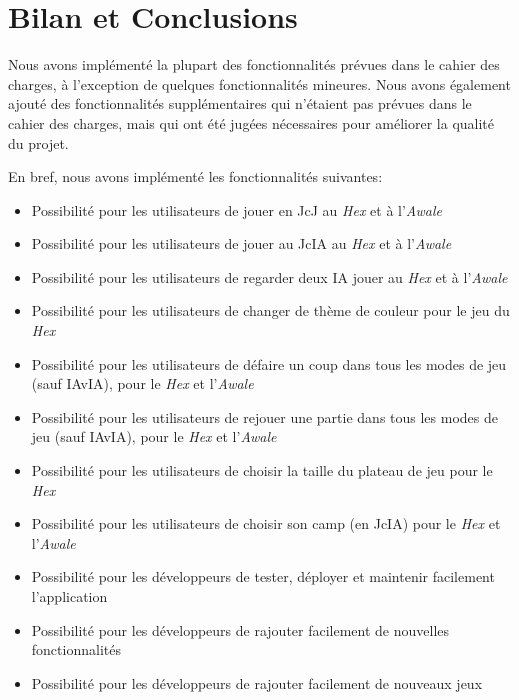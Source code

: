 \section{Bilan et Conclusions}

Nous avons implémenté la plupart des fonctionnalités prévues dans le cahier des charges, à l'exception de quelques
fonctionnalités mineures. Nous avons également ajouté des fonctionnalités supplémentaires qui n'étaient pas prévues
dans le cahier des charges, mais qui ont été jugées nécessaires pour améliorer la qualité du projet.

En bref, nous avons implémenté les fonctionnalités suivantes:

\begin{itemize}
    \item Possibilité pour les utilisateurs de jouer en JcJ au \emph{Hex} et à l'\emph{Awale}
    \item Possibilité pour les utilisateurs de jouer au JcIA au \emph{Hex} et à l'\emph{Awale}
    \item Possibilité pour les utilisateurs de regarder deux IA jouer au \emph{Hex} et à l'\emph{Awale}
    \item Possibilité pour les utilisateurs de changer de thème de couleur pour le jeu du \emph{Hex}
    \item Possibilité pour les utilisateurs de défaire un coup dans tous les modes de jeu (sauf IAvIA), pour le \emph{Hex} et l'\emph{Awale}
    \item Possibilité pour les utilisateurs de rejouer une partie dans tous les modes de jeu (sauf IAvIA), pour le \emph{Hex} et l'\emph{Awale}
    \item Possibilité pour les utilisateurs de choisir la taille du plateau de jeu pour le \emph{Hex}
    \item Possibilité pour les utilisateurs de choisir son camp (en JcIA) pour le \emph{Hex} et l'\emph{Awale}
    \item Possibilité pour les développeurs de tester, déployer et maintenir facilement l'application
    \item Possibilité pour les développeurs de rajouter facilement de nouvelles fonctionnalités
    \item Possibilité pour les développeurs de rajouter facilement de nouveaux jeux
\end{itemize}